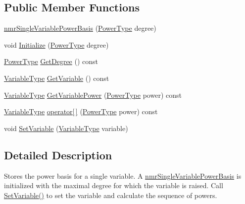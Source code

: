 \subsection*{Public Member Functions}
\begin{DoxyCompactItemize}
\item 
\hyperlink{classnmr_single_variable_power_basis_a56ba4788253350a1c3bf81d945011fb4}{nmr\-Single\-Variable\-Power\-Basis} (\hyperlink{classnmr_single_variable_power_basis_ae580b034e01160a9fc39455a9356730f}{Power\-Type} degree)
\item 
void \hyperlink{classnmr_single_variable_power_basis_a6e5e7f3f5bc667cd5fa20670edc9526a}{Initialize} (\hyperlink{classnmr_single_variable_power_basis_ae580b034e01160a9fc39455a9356730f}{Power\-Type} degree)
\item 
\hyperlink{classnmr_single_variable_power_basis_ae580b034e01160a9fc39455a9356730f}{Power\-Type} \hyperlink{classnmr_single_variable_power_basis_a90634b2343f121f78377a16780632fc8}{Get\-Degree} () const 
\item 
\hyperlink{classnmr_single_variable_power_basis_a4500df2ac423b7a55c32183275b2d7a2}{Variable\-Type} \hyperlink{classnmr_single_variable_power_basis_a9b70d9d391784fadd7ff343a68dc8327}{Get\-Variable} () const 
\item 
\hyperlink{classnmr_single_variable_power_basis_a4500df2ac423b7a55c32183275b2d7a2}{Variable\-Type} \hyperlink{classnmr_single_variable_power_basis_a91e5ce5da8ae59cf0016509bd03ef576}{Get\-Variable\-Power} (\hyperlink{classnmr_single_variable_power_basis_ae580b034e01160a9fc39455a9356730f}{Power\-Type} power) const 
\item 
\hyperlink{classnmr_single_variable_power_basis_a4500df2ac423b7a55c32183275b2d7a2}{Variable\-Type} \hyperlink{classnmr_single_variable_power_basis_a30ba3a85cf29345765e32c8ad2162328}{operator\mbox{[}$\,$\mbox{]}} (\hyperlink{classnmr_single_variable_power_basis_ae580b034e01160a9fc39455a9356730f}{Power\-Type} power) const 
\item 
void \hyperlink{classnmr_single_variable_power_basis_ac4b1f67349ee8aae11b5500efae311c2}{Set\-Variable} (\hyperlink{classnmr_single_variable_power_basis_a4500df2ac423b7a55c32183275b2d7a2}{Variable\-Type} variable)
\end{DoxyCompactItemize}


\subsection{Detailed Description}
Stores the power basis for a single variable. A \hyperlink{classnmr_single_variable_power_basis}{nmr\-Single\-Variable\-Power\-Basis} is initialized with the maximal degree for which the variable is raised. Call \hyperlink{classnmr_single_variable_power_basis_ac4b1f67349ee8aae11b5500efae311c2}{Set\-Variable()} to set the variable and calculate the sequence of powers. 

